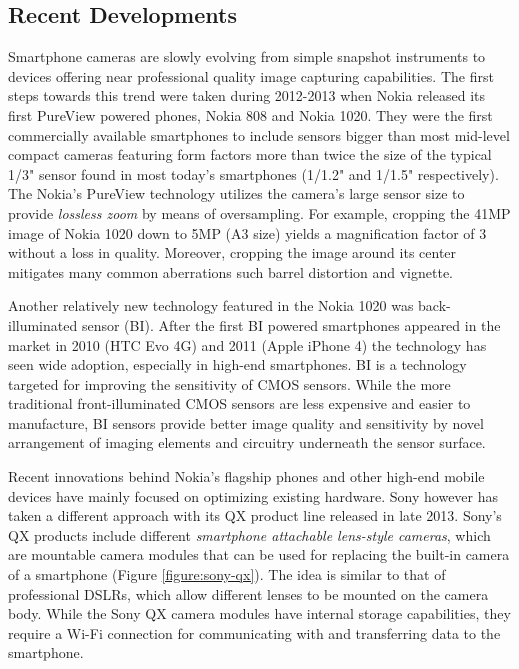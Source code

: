 \documentclass[thesis.tex]{subfiles}
\begin{document}
\subsection{Recent Developments}\label{chapter:solutions}

Smartphone cameras are slowly evolving from simple snapshot instruments to devices offering near professional quality image capturing capabilities. The first steps towards this trend were taken during 2012-2013 when Nokia released its first PureView powered phones, Nokia 808 and Nokia 1020. They were the first commercially available smartphones to include sensors bigger than most mid-level compact cameras featuring form factors more than twice the size of the typical 1/3" sensor found in most today's smartphones (1/1.2" and 1/1.5" respectively). The Nokia's PureView technology utilizes the camera's large sensor size to provide \textit{lossless zoom} by means of oversampling. For example, cropping the 41MP image of Nokia 1020 down to 5MP (A3 size) yields a magnification factor of 3 without a loss in quality. Moreover, cropping the image around its center mitigates many common aberrations such barrel distortion and vignette. \cite{lumia_1020}

Another relatively new technology featured in the Nokia 1020 was back-illuminated sensor (BI). After the first BI powered smartphones appeared in the market in 2010 (HTC Evo 4G) and 2011 (Apple iPhone 4) the technology has seen wide adoption, especially in high-end smartphones. BI is a technology targeted for improving the sensitivity of CMOS sensors. While the more traditional front-illuminated CMOS sensors are less expensive and easier to manufacture, BI sensors provide better image quality and sensitivity by novel arrangement of imaging elements and circuitry underneath the sensor surface.

Recent innovations behind Nokia's flagship phones and other high-end mobile devices have mainly focused on optimizing existing hardware. Sony however has taken a different approach with its QX product line released in late 2013. Sony's QX products include different \textit{smartphone attachable lens-style cameras}, which are mountable camera modules that can be used for replacing the built-in camera of a smartphone (Figure \ref{figure:sony-qx}). The idea is similar to that of professional DSLRs, which allow different lenses to be mounted on the camera body. While the Sony QX camera modules have internal storage capabilities, they require a Wi-Fi connection for communicating with and transferring data to the smartphone.
\end{document}
